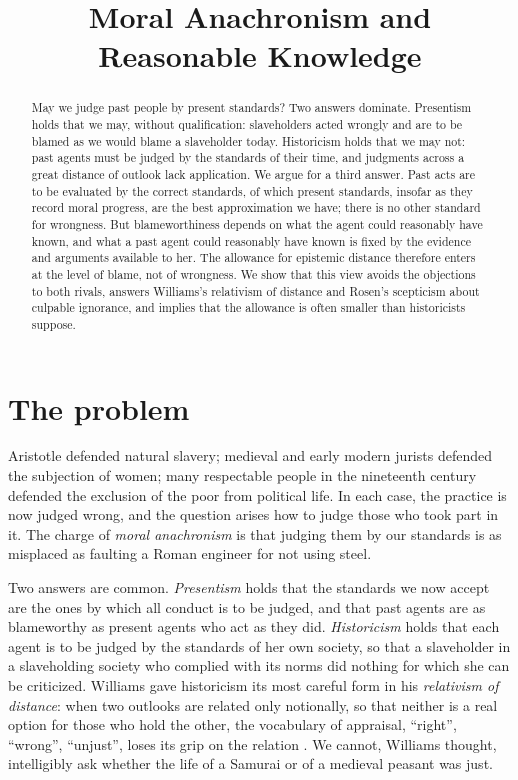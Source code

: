 \documentclass{situationist-preprint}
\title{Moral Anachronism and Reasonable Knowledge}
\begin{document}
\maketitle

\begin{abstract}
May we judge past people by present standards? Two answers dominate. Presentism holds that we may, without qualification: slaveholders acted wrongly and are to be blamed as we would blame a slaveholder today. Historicism holds that we may not: past agents must be judged by the standards of their time, and judgments across a great distance of outlook lack application. We argue for a third answer. Past acts are to be evaluated by the correct standards, of which present standards, insofar as they record moral progress, are the best approximation we have; there is no other standard for wrongness. But blameworthiness depends on what the agent could reasonably have known, and what a past agent could reasonably have known is fixed by the evidence and arguments available to her. The allowance for epistemic distance therefore enters at the level of blame, not of wrongness. We show that this view avoids the objections to both rivals, answers Williams's relativism of distance and Rosen's scepticism about culpable ignorance, and implies that the allowance is often smaller than historicists suppose.
\end{abstract}

\section{The problem}

Aristotle defended natural slavery; medieval and early modern jurists defended the subjection of women; many respectable people in the nineteenth century defended the exclusion of the poor from political life. In each case, the practice is now judged wrong, and the question arises how to judge those who took part in it. The charge of \emph{moral anachronism} is that judging them by our standards is as misplaced as faulting a Roman engineer for not using steel.

Two answers are common. \emph{Presentism} holds that the standards we now accept are the ones by which all conduct is to be judged, and that past agents are as blameworthy as present agents who act as they did. \emph{Historicism} holds that each agent is to be judged by the standards of her own society, so that a slaveholder in a slaveholding society who complied with its norms did nothing for which she can be criticized. Williams gave historicism its most careful form in his \emph{relativism of distance}: when two outlooks are related only notionally, so that neither is a real option for those who hold the other, the vocabulary of appraisal, ``right'', ``wrong'', ``unjust'', loses its grip on the relation \citep[ch.~9]{Williams1985}. We cannot, Williams thought, intelligibly ask whether the life of a Samurai or of a medieval peasant was just.
\end{document}
